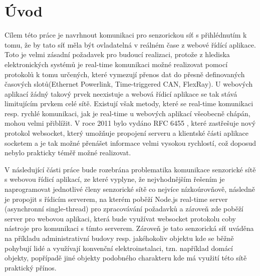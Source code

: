 \chapter{Úvod}
Cílem této práce je navrhnout komunikaci pro senzorickou síť s přihlédnutím k tomu, že by tato síť měla být ovladatelná v reálném čase z webové řídící aplikace. Toto je velmi zásadní požadavek pro budoucí realizaci, protože z hlediska elektronických systémů je real-time komunikaci možné realizovat pomocí protokolů k tomu určených, které vymezují přenos dat do přesně definovaných časových slotů(Ethernet Powerlink, Time-triggered CAN, FlexRay). U webových aplikací žádný takový prvek neexistuje a webová řídicí aplikace se tak stává limitujícím prvkem celé sítě. Existují však metody, které se real-time komunikaci resp. rychlé komunikaci, jak je real-time u webových aplikací všeobecně chápán, mohou velmi přiblížit. V roce 2011 bylo vydáno RFC 6455 \cite{rfc6455}, které zastřešuje nový protokol websocket, který umožňuje propojení serveru a klientské části aplikace socketem a je tak možné přenášet informace velmi vysokou rychlostí, což doposud nebylo prakticky téměř možné realizovat.

V následující části práce bude rozebrána problematika komunikace senzorické sítě s webovou řídicí aplikací, ze které vyplyne, že nejvhodnějším řešením je naprogramovat jednotlivé členy senzorické sítě co nejvíce ní\-zko\-ú\-rov\-ňo\-vě, následně je propojit s řídicím serverem, na kterém poběží Node.js real-time server (asynchronní single-thread) pro zpracovávání požadavků a zároveň zde poběží server pro webovou aplikaci, která bude využívat websocket protokolu coby nástroje pro komunikaci s tímto serverem. Zároveň je tato senzorická síť uváděna na příkladu administrativní budovy resp. jakéhokoliv objektu kde se běžně pohybují lidé a využívají konvenční elektroinstalaci, tzn. například domácí objekty, popřípadě jiné objekty podobného charakteru kde má využití této sítě praktický přínos.